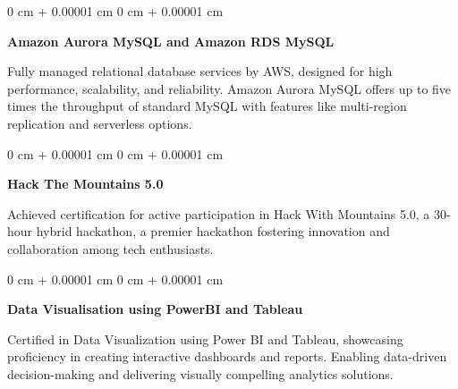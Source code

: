\documentclass[10pt, letterpaper]{article}
\newenvironment{onecolentry}{
    \begin{adjustwidth}{
        0 cm + 0.00001 cm
    }{
        0 cm + 0.00001 cm
    }
}{
    \end{adjustwidth}
} %
\begin{document}
        
        \begin{onecolentry}
            \textbf{Amazon Aurora MySQL and Amazon RDS MySQL }
            
            Fully managed relational database services by AWS, designed for high performance, scalability, and reliability. Amazon Aurora MySQL offers up to five times the throughput of standard MySQL with features like multi-region replication and serverless options.  
        \end{onecolentry}

        

        \vspace{0.2 cm}

        \begin{onecolentry}
            \textbf{Hack The Mountains 5.0 } 
            
           Achieved certification for active participation in Hack With Mountains 5.0, a 30-hour hybrid hackathon, a premier hackathon fostering innovation and collaboration among tech enthusiasts.  
        \end{onecolentry}


         \vspace{0.2 cm}

        \begin{onecolentry}
            \textbf{Data Visualisation using PowerBI and Tableau  } 
            
           Certified in Data Visualization using Power BI and Tableau, showcasing proficiency in creating interactive dashboards and reports. Enabling data-driven decision-making and delivering visually compelling analytics solutions.    
        \end{onecolentry}


    
\end{document}

